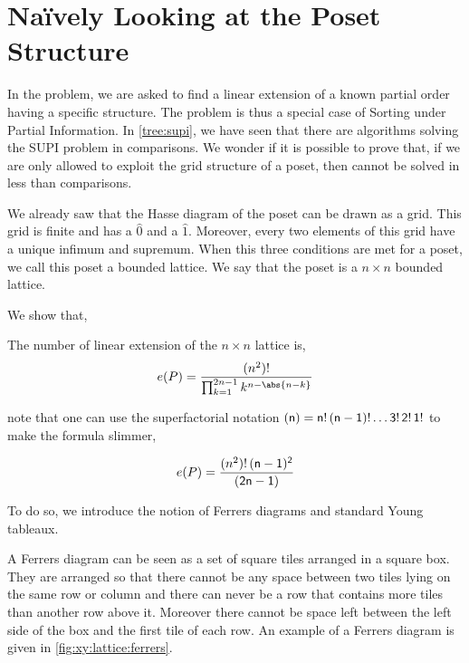 \section{Naïvely Looking at the Poset Structure}
\label{tree:xy:grid}

In the \XY problem, we are asked to find a linear extension of a known partial
order having a specific structure. The \XY problem is thus a special case of
Sorting under Partial Information. In \ref{tree:supi}, we have seen that there
are algorithms solving the SUPI problem in  comparisons. We
wonder if it is possible to prove that, if we are only allowed to exploit the
grid structure of a \XY poset, then \XY cannot be solved in less than  comparisons.

We already saw that the Hasse diagram of the poset \XY can be drawn as a grid.
This grid is finite and has a \(\hat{0}\) and a \(\hat{1}\). Moreover, every
two elements of this grid have a unique infimum and supremum. When this three
conditions are met for a poset, we call this poset a bounded lattice. We say
that the poset \XY is a \( n \times n \) bounded lattice.

We show that,

\begin{theorem}
The number of linear extension of the \( n \times n \) lattice is,
\begin{displaymath}
e(P) = \frac{(n^2)!}{\prod_{k=1}^{2n-1} k^{n - \abs{n-k}}}
\end{displaymath}
\end{theorem}

note that one can use the superfactorial notation
\( \sf(n) = n!\,(n-1)!\ldots 3!\,2!\,1! \)
to make the formula slimmer,

\begin{displaymath}
e(P) = \frac{(n^2)! \, \sf(n-1)^2}{\sf(2n-1)}
\end{displaymath}

To do so, we introduce the notion of Ferrers diagrams and standard Young tableaux.

A Ferrers diagram can be seen as a set of square tiles arranged in a square
box. They are arranged so that there cannot be any space between two tiles
lying on the same row or column and there can never be a row that contains more
tiles than another row above it. Moreover there cannot be space left between
the left side of the box and the first tile of each row. An example of a
Ferrers diagram is given in \ref{fig:xy:lattice:ferrers}.

